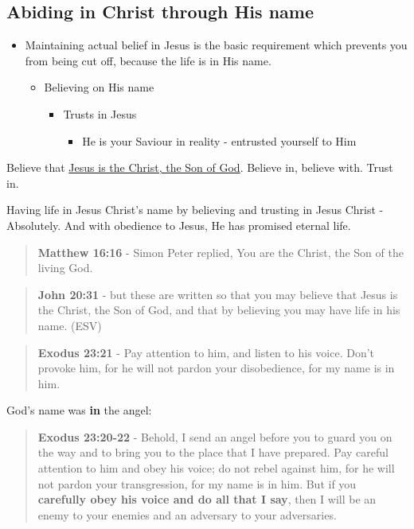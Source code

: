 \documentclass[11pt]{article}
\begin{document}
\subsection{Abiding in Christ through His name}
\label{sec:orga0b477f}
\begin{itemize}
\item Maintaining actual belief in Jesus is the basic requirement which prevents you from being cut off, because the life is in His name.
\begin{itemize}
\item Believing on His name
\begin{itemize}
\item Trusts in Jesus
\begin{itemize}
\item He is your Saviour in reality - entrusted yourself to Him
\end{itemize}
\end{itemize}
\end{itemize}
\end{itemize}

Believe that \uline{Jesus is the Christ, the Son of God}. Believe in, believe with. Trust in.

Having life in Jesus Christ's name by believing and trusting in Jesus Christ - Absolutely.
And with obedience to Jesus, He has promised eternal life.

\begin{quote}
\textbf{Matthew 16:16} - Simon Peter replied, You are the Christ, the Son of the living God.
\end{quote}

\begin{quote}
\textbf{John 20:31} - but these are written so that you may believe that Jesus is the Christ, the Son of God, and that by believing you may have life in his name. (ESV)
\end{quote}

\begin{quote}
\textbf{Exodus 23:21} - Pay attention to him, and listen to his voice. Don't provoke him, for he will not pardon your disobedience, for my name is in him.
\end{quote}

God's name was \textbf{in} the angel:

\begin{quote}
\textbf{Exodus 23:20-22} - Behold, I send an angel before you to guard you on the way and to bring you to the place that I have prepared. Pay careful attention to him and obey his voice; do not rebel against him, for he will not pardon your transgression, for my name is in him. But if you \textbf{carefully obey his voice and do all that I say}, then I will be an enemy to your enemies and an adversary to your adversaries.
\end{quote}
\end{document}
